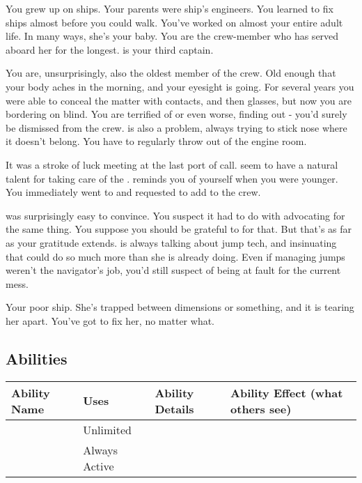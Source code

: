 \documentclass[char]{TMFHope}
\begin{document}
\name{\cEng{}}

You grew up on ships. Your parents were ship's engineers. You learned to fix ships almost before you could walk. You've worked on \pNew{} almost your entire adult life. In many ways, she's your baby. You are the crew-member who has served aboard her for the longest. \cCap{} is your third captain.

You are, unsurprisingly, also the oldest member of the crew. Old enough that your body aches in the morning, and your eyesight is going. For several years you were able to conceal the matter with contacts, and then glasses, but now you are bordering on blind. You are terrified of \cCap{} or even worse, \cXO{} finding out - you'd surely be dismissed from the crew. \cWeap{} is also a problem, always trying to stick \cWeap{\their} nose where it doesn't belong. You have to regularly throw \cWeap{\them} out of the engine room.

It was a stroke of luck meeting \cBoy{} at the last port of call. \cBoy{\They} seem\cBoy{\plural} to have a natural talent for taking care of the \pNew{}. \cBoy{} reminds you of yourself when you were younger. You immediately went to \cCap{} and requested to add \cBoy{} to the crew.

\cCap{} was surprisingly easy to convince. You suspect it had to do with \cNav{} advocating for the same thing. You suppose you should be grateful to \cNav{\them} for that. But that's as far as your gratitude extends. \cNav{} is always talking about jump tech, and insinuating that \pNew{} could do so much more than she is already doing. Even if managing jumps weren't the navigator's job, you'd still suspect \cNav{} of being at fault for the current mess.

Your poor ship. She's trapped between dimensions or something, and it is tearing her apart. You've got to fix her, no matter what.

\subsection*{Abilities}
\begin{tabular}{|p{2.5cm}|p{1.5cm}|p{10cm}|p{2cm}|} 
 \hline
 \textbf{Ability Name} & \textbf{Uses} & \textbf{Ability Details} & \textbf{Ability Effect (what others see)} \\ 
\hline 
 \aEngineering{\MYname} & Unlimited & \aEngineering{\MYtext} & \aEngineering{\MYeffect} \\ 
\hline
 \aEyesight{\MYname} & Always Active & \aEyesight{\MYtext} & \aEyesight{\MYeffect}\\ 
 \hline
\end{tabular}
\end{document}
